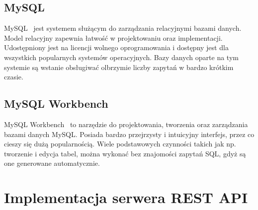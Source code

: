 \subsection{MySQL}
MySQL~\cite{SQL} jest systemem służącym do zarządzania relacyjnymi bazami danych. Model relacyjny zapewnia łatwość w projektowaniu oraz implementacji. Udostępniony jest na licencji wolnego oprogramowania i dostępny jest dla wszystkich popularnych systemów operacyjnych. Bazy danych oparte na tym systemie są wstanie obsługiwać olbrzymie liczby zapytań w bardzo krótkim czasie.
\subsection{MySQL Workbench}
MySQL Workbench~\cite{Workbench} to narzędzie do projektowania, tworzenia oraz zarządzania bazami danych MySQL. Posiada bardzo przejrzysty i intuicyjny interfejs, przez co cieszy się dużą popularnością. Wiele podstawowych czynności takich jak np. tworzenie i edycja tabel, można wykonać bez znajomości zapytań SQL, gdyż są one generowane automatycznie.

\section{Implementacja serwera REST API}
